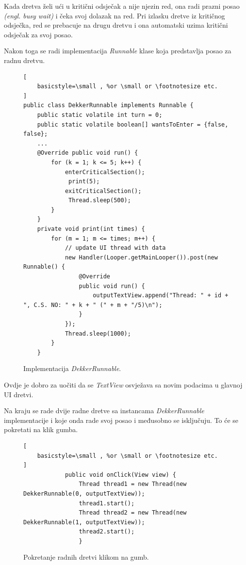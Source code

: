 \documentclass[times, utf8, zavrsni]{fer}
\begin{document}
Kada dretva želi ući u kritični odsječak a nije njezin red, ona radi prazni posao \textit{(engl. busy wait)} i čeka svoj dolazak na red. Pri izlasku dretve iz kritičnog odsječka, red se prebacuje na drugu dretvu i ona automatski uzima kritični odsječak za svoj posao.\newpage

Nakon toga se radi implementacija \textit{Runnable} klase koja predstavlja posao za radnu dretvu.

\begin{figure}[ht!]
\begin{lstlisting}[
    basicstyle=\small , %or \small or \footnotesize etc.
]
public class DekkerRunnable implements Runnable {
    public static volatile int turn = 0;
    public static volatile boolean[] wantsToEnter = {false, false};
    ...
    @Override public void run() {
        for (k = 1; k <= 5; k++) {
            enterCriticalSection();
             print(5);
            exitCriticalSection();
             Thread.sleep(500);
        }
    }
    private void print(int times) {
        for (m = 1; m <= times; m++) {
            // update UI thread with data
            new Handler(Looper.getMainLooper()).post(new Runnable() {
                @Override
                public void run() {
                    outputTextView.append("Thread: " + id + ", C.S. NO: " + k + " (" + m + "/5)\n");
                }
            });
            Thread.sleep(1000);
        }
    }

\end{lstlisting}
\caption{Implementacija \textit{DekkerRunnable}.}
\label{overflow}
\end{figure}

Ovdje je dobro za uočiti da se \textit{TextView} osvježava sa novim podacima u glavnoj UI dretvi.\newpage

Na kraju se rade dvije radne dretve sa instancama \textit{DekkerRunnable} implementacije i koje onda rade svoj posao i međusobno se isključuju. To će se pokretati na klik gumba.

\begin{figure}[ht!]
\begin{lstlisting}[
    basicstyle=\small , %or \small or \footnotesize etc.
]
            public void onClick(View view) {
                Thread thread1 = new Thread(new DekkerRunnable(0, outputTextView));
                thread1.start();
                Thread thread2 = new Thread(new DekkerRunnable(1, outputTextView));
                thread2.start();
				}
\end{lstlisting}
\caption{Pokretanje radnih dretvi klikom na gumb.}
\label{overflow}
\end{figure}
\end{document}
